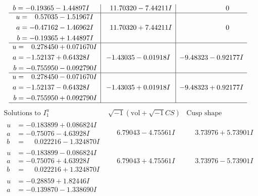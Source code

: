 \documentclass[1p]{elsarticle_modified}
\theoremstyle{definition}
\newcommand{\I}{\sqrt{-1}}
\begin{document}
$$\begin{array}{c|c|c}
\begin{aligned}
b &= -0.19365 - 1.44897 I\end{aligned}
 & \phantom{-}11.70320 - 7.44211 I & \phantom{-0.000000 } 0 \\ \hline\begin{aligned}
u &= \phantom{-}0.57035 - 1.51967 I \\
a &= -0.47162 - 1.46962 I \\
b &= -0.19365 + 1.44897 I\end{aligned}
 & \phantom{-}11.70320 + 7.44211 I & \phantom{-0.000000 } 0 \\ \hline\begin{aligned}
u &= \phantom{-}0.278450 + 0.071670 I \\
a &= -1.52137 + 0.64328 I \\
b &= -0.755950 - 0.092790 I\end{aligned}
 & -1.43035 - 0.01918 I & -9.48323 - 0.92177 I \\ \hline\begin{aligned}
u &= \phantom{-}0.278450 - 0.071670 I \\
a &= -1.52137 - 0.64328 I \\
b &= -0.755950 + 0.092790 I\end{aligned}
 & -1.43035 + 0.01918 I & -9.48323 + 0.92177 I\\
 \hline 
 \end{array}$$\newpage$$\begin{array}{c|c|c}  
\text{Solutions to }I^u_{1}& \I (\text{vol} + \sqrt{-1}CS) & \text{Cusp shape}\\
 \hline 
\begin{aligned}
u &= -0.183899 + 0.086824 I \\
a &= -0.75076 - 4.63928 I \\
b &= \phantom{-}0.022216 - 1.324870 I\end{aligned}
 & \phantom{-}6.79043 - 4.75561 I & \phantom{-}3.73976 + 5.73901 I \\ \hline\begin{aligned}
u &= -0.183899 - 0.086824 I \\
a &= -0.75076 + 4.63928 I \\
b &= \phantom{-}0.022216 + 1.324870 I\end{aligned}
 & \phantom{-}6.79043 + 4.75561 I & \phantom{-}3.73976 - 5.73901 I \\ \hline\begin{aligned}
u &= -0.28859 + 1.82446 I \\
a &= -0.139870 - 1.338690 I \\

\end{aligned}
\end{array}$$
\end{document}
